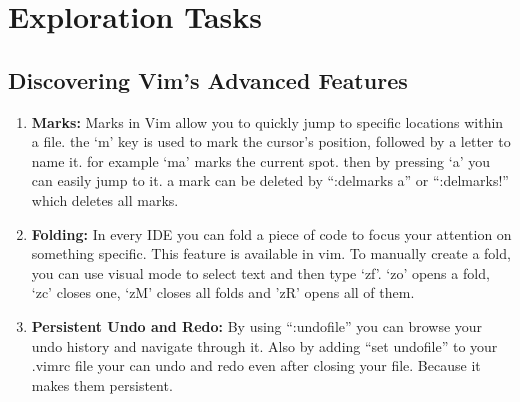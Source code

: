\documentclass[12pt]{article}
\begin{document}
\newpage

\section{Exploration Tasks}
\subsection{Discovering Vim's Advanced Features}
\begin{enumerate}
    \item \textbf{Marks:} Marks in Vim allow you to quickly jump to specific locations within a file. the `m' key is used to mark the cursor's position, followed by a letter to name it. for example `ma' marks the current spot. then by pressing `a' you can easily jump to it. a mark can be deleted by ``:delmarks a'' or ``:delmarks!'' which deletes all marks.
    \item \textbf{Folding:} In every IDE you can fold a piece of code to focus your attention on something specific. This feature is available in vim. To manually create a fold, you can use visual mode to select text and then type `zf'. `zo' opens a fold, `zc' closes one, `zM' closes all folds and 'zR' opens all of them.
    \item \textbf{Persistent Undo and Redo:} By using ``:undofile'' you can browse your undo history and navigate through it. Also by adding ``set undofile'' to your .vimrc file your can undo and redo even after closing your file. Because it makes them persistent. 
\end{enumerate}
\end{document}
